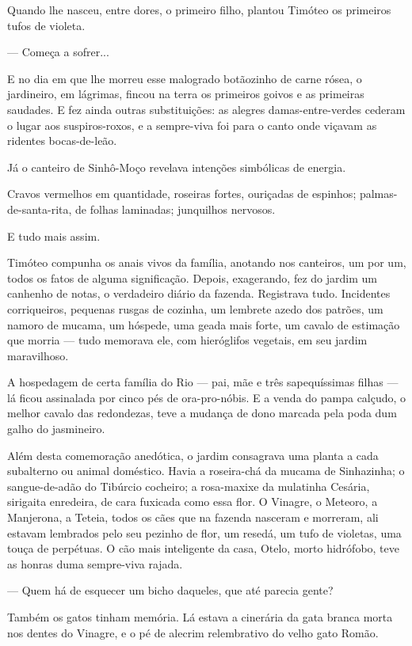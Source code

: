 Quando lhe nasceu, entre dores, o primeiro filho, plantou Timóteo os
primeiros tufos de violeta.

--- Começa a sofrer...

E no dia em que lhe morreu esse malogrado botãozinho de carne rósea, o
jardineiro, em lágrimas, fincou na terra os primeiros goivos e as
primeiras saudades. E fez ainda outras substituições: as alegres
damas-entre-verdes cederam o lugar aos suspiros-roxos, e a sempre-viva
foi para o canto onde viçavam as ridentes bocas-de-leão.

Já o canteiro de Sinhô-Moço revelava intenções simbólicas de energia.

Cravos vermelhos em quantidade, roseiras fortes, ouriçadas de espinhos;
palmas-de-santa-rita, de folhas laminadas; junquilhos nervosos.

E tudo mais assim.

Timóteo compunha os anais vivos da família, anotando nos canteiros, um
por um, todos os fatos de alguma significação. Depois, exagerando, fez
do jardim um canhenho de notas, o verdadeiro diário da fazenda.
Registrava tudo. Incidentes corriqueiros, pequenas rusgas de cozinha, um
lembrete azedo dos patrões, um namoro de mucama, um hóspede, uma geada
mais forte, um cavalo de estimação que morria --- tudo memorava ele, com
hieróglifos vegetais, em seu jardim maravilhoso.

A hospedagem de certa família do Rio --- pai, mãe e três sapequíssimas
filhas --- lá ficou assinalada por cinco pés de ora-pro-nóbis. E a venda
do pampa calçudo, o melhor cavalo das redondezas, teve a mudança de dono
marcada pela poda dum galho do jasmineiro.

Além desta comemoração anedótica, o jardim consagrava uma planta a cada
subalterno ou animal doméstico. Havia a roseira-chá da mucama de
Sinhazinha; o sangue-de-adão do Tibúrcio cocheiro; a rosa-maxixe da
mulatinha Cesária, sirigaita enredeira, de cara fuxicada como essa flor.
O Vinagre, o Meteoro, a Manjerona, a Teteia, todos os cães que na
fazenda nasceram e morreram, ali estavam lembrados pelo seu pezinho de
flor, um resedá, um tufo de violetas, uma touça de perpétuas. O cão mais
inteligente da casa, Otelo, morto hidrófobo, teve as honras duma
sempre-viva rajada.

--- Quem há de esquecer um bicho daqueles, que até parecia gente?

Também os gatos tinham memória. Lá estava a cinerária da gata branca
morta nos dentes do Vinagre, e o pé de alecrim relembrativo do velho
gato Romão.

